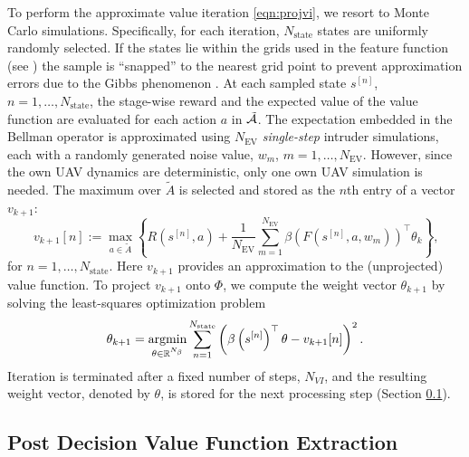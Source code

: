 To perform the approximate value iteration \eqref{eqn:projvi}, we resort to Monte Carlo simulations. Specifically, for each iteration, $N_\text{state}$ states are uniformly randomly selected. If the states lie within the grids used in the feature function (see ) the sample is ``snapped'' to the nearest grid point to prevent approximation errors due to the Gibbs phenomenon \cite{JF-FBR:91}. At each sampled state $s^{[n]}$, $n=1,\ldots, N_\text{state}$, the stage-wise reward and the expected value of the value function are evaluated for each action $a$ in $\tilde{\mathcal{A}}$. The expectation embedded in the Bellman operator is approximated using $N_{\text{EV}}$ \emph{single-step} intruder simulations, each with a randomly generated noise value, $w_m$, $m=1,\ldots, N_{\text{EV}}$. However, since the own UAV dynamics are deterministic, only one own UAV simulation is needed. The maximum over $\tilde{A}$ is selected and stored as the $n$th entry of a vector $v_{k+1}$:
\begin{equation}
    v_{k+1}[n] := \max_{a \in \tilde{A}} \left\{R(s^{[n]},a) + \frac{1}{N_{\text{EV}}}\sum_{m=1}^{N_{\text{EV}}} \beta(F(s^{[n]}, a, w_m))^\top \theta_k \right\} \text{,}
\end{equation}
for $n=1,\ldots, N_\text{state}$. Here $v_{k+1}$ provides an approximation to the (unprojected) value function. To project $v_{k+1}$ onto $\Phi$, we compute the weight vector $\theta_{k+1}$ by solving the least-squares optimization problem
\begin{equation}
    \theta_{k+1} = \underset{\theta\in \reals^{N_\beta}}{\argmin} \sum_{n=1}^{N_\text{state}} \left( \beta\left(s^{[n]}\right)^\top \theta - v_{k+1}[n] \right) ^2 \text{.}
\end{equation}
Iteration is terminated after a fixed number of steps, $N_{VI}$, and the resulting weight vector, denoted by $\theta$, is stored for the next processing step (Section \ref{sec:extract}).

\subsection{Post Decision Value Function Extraction} \label{sec:extract}

